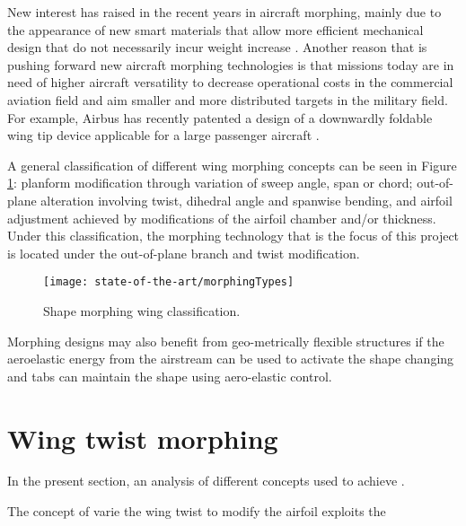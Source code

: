 New interest has raised in the recent years in aircraft morphing, mainly due to the appearance of new smart materials that allow more efficient mechanical design that do not necessarily incur weight increase \cite{Lloyd2007}. Another reason that is pushing forward new aircraft morphing technologies is that missions today are in need of higher aircraft versatility to decrease operational costs in the commercial aviation field and aim smaller and more distributed targets in the military field. For example, Airbus has recently patented a design of a downwardly foldable wing tip device applicable for a large passenger aircraft \cite{Boye2015}.

A general classification of different wing morphing concepts can be seen in Figure \ref{fig:morphingTypes}: planform modification through variation of sweep angle, span or chord; out-of-plane alteration involving twist, dihedral angle and spanwise bending, and airfoil adjustment achieved by modifications of the airfoil chamber and/or thickness. Under this classification, the morphing technology that is the focus of this project is located under the out-of-plane branch and twist modification.
 

\begin{figure}[!htpb]
  \centering
  \texttt{[image: state-of-the-art/morphingTypes]}
  \caption[Shape morphing wing classification]{Shape morphing wing classification. \cite{Barbarino2011}}\label{fig:morphingTypes}
\end{figure}

Morphing designs may also benefit from geo-metrically flexible structures if the aeroelastic energy from the airstream can be used to activate the shape changing and tabs can maintain the shape using aero-elastic control.


\section{Wing twist morphing} \label{sec:twist_state}

In the present section, an analysis of different concepts used to achieve .

The concept of varie the wing twist to modify the airfoil exploits the 
